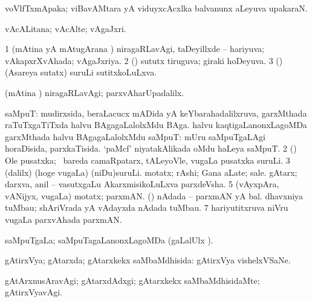 {{{{{{{{{{{{{\bentry 
{} 
\gl{\nA}
\expl{}
\bmng
 voVlfTxmApaka; viBavAMtara yA viduyxcAcxlka balvanunx aLeyuva upakaraN. 
\emng
\eentry

\bentry
{} 
\gl{\nA}
\expl{}
\bmng
 vAcALitana; vAcAlte; vAgaJxri. 
\emng
\eentry

\bentry
{} 
\gl{\gu}
\expl{}
\bmng
\bnum
\num{1} (mAtina yA mAtugArana \vi) niragaRLavAgi, taDeyillxde -- hariyuva; vAkapxrXvAhada; vAgaJxriya. 
\num{2} (\pArxparx) sututx tiruguva; giraki hoDeyuva. 
\num{3} (\savi) (Asareya sutatx) suruLi sutitxkoLuLxva. 
\enum
\emng
\eentry

\bentry 
{} 
\gl{\nA}
\expl{}
\bmng
\emng
\eentry

\bentry
{} 
\gl{\kirxvi}
\expl{}
\bmng
 (mAtina \vi) niragaRLavAgi; parxvAharUpadalilx. 
\emng
\eentry

\bentry 
{} 
\gl{\nA}
\expl{}
\bmng
\bnum
{} saMpuT: 
\banum
{} mudirxsida, beraLacucx mADida yA keYbarahadalilxruva, garxMthada raTuTxgaTiTxda halvu BAgagaLalolxMdu BAga. 
 halvu kaqtigaLanonxLagoMDa garxMthada halvu BAgagaLalolxMdu saMpuT:  mUru saMpuTgaLAgi horaDisida, parxkaTisida.  `paMcf' niyatakAlikada oMdu haLeya saMpuT. 
\eanum
\numie
\num{2} (\ca) Ole pusatxka; \sA\ bareda camaRpatarx, tALeyoVle, \mo vugaLa pusatxka suruLi. 
\num{3} (\bava dalilx) (hoge \mo vugaLa) (niDu)suruLi. 
\banum
{} motatx; rAshi; Gana aLate; sale. 
 gAtarx; darxva, anil -- vasutxgaLu AkarxmisikoLuLxva parxdeVsha. 
\eanum
\numie
\num{5} (vAyxpAra, vANijyx, \mo vugaLa) motatx; parxmAN. 
 (\saM) 
\banum
{} nAdada -- parxmAN yA bal. 
 dhavxniya tuMbau; shAriVrada yA vAdayxda nAdada tuMbau. 
\eanum
\numie
\num{7} hariyutitxruva niVru \mo vugaLa parxvAhada parxmAN. 
\enum
\emng
\eentry

\bentry
{} 
\gl{\gu}
\expl{}
\bmng
 saMpuTgaLa; saMpuTagaLanonxLagoMDa (\saMpa gaLalUlx \parx). 
\emng
\eentry

\bentry 
{} 
\gl{\gu}
\expl{}
\bmng
 gAtirxVya; gAtarxda; gAtarxkekx saMbaMdhisida:  gAtirxVya vishelxVSaNe. 
\emng
\eentry

\bentry
{} 
\gl{\kirxvi}
\expl{}
\bmng
 gAtArxnusAravAgi; gAtarxdAdxgi; gAtarxkekx saMbaMdhisidaMte; gAtirxVyavAgi. 
\emng
\eentry

}}}}}}}}}}}}}
